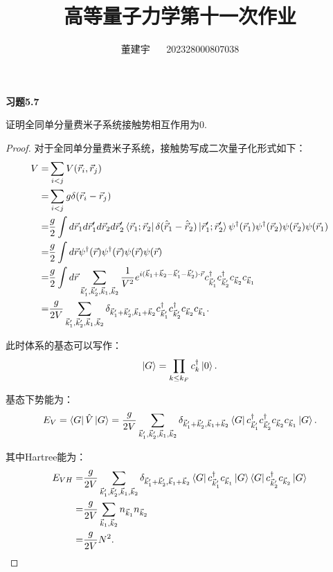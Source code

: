 \documentclass[reqno,a4paper,12pt]{amsart}
\title{高等量子力学第十一次作业}
\author{董建宇 ~~ 202328000807038}
\begin{document}
\maketitle

\textbf{习题5.7}

证明全同单分量费米子系统接触势相互作用为0.

\begin{proof}
对于全同单分量费米子系统，接触势写成二次量子化形式如下：
\begin{align*}
	V =& \sum_{i<j} V(\vec{r}_i, \vec{r}_j) \\
	=& \sum_{i<j} g \delta(\vec{r}_i - \vec{r}_j) \\
	=& \frac{g}{2} \int d\vec{r}_1 d\vec{r}_1' d\vec{r}_2 d\vec{r}_2' \bra{\vec{r}_1; \vec{r}_2} \delta(\hat{\vec{r}}_1 - \hat{\vec{r}}_2) \ket{\vec{r}_1'; \vec{r}_2'} \psi^\dagger(\vec{r}_1) \psi^\dagger(\vec{r}_2) \psi(\vec{r}_2) \psi(\vec{r}_1) \\
	=& \frac{g}{2} \int d\vec{r} \psi^\dagger(\vec{r}) \psi^\dagger(\vec{r}) \psi(\vec{r}) \psi(\vec{r}) \\
	=& \frac{g}{2} \int d\vec{r} \sum_{\vec{k}_1',\vec{k}_2',\vec{k}_1,\vec{k}_2} \frac{1}{V^2} e^{i(\vec{k}_1+\vec{k}_2-\vec{k}_1'-\vec{k}_2') \cdot \vec{r}} c^\dagger_{\vec{k}_1'} c^\dagger_{\vec{k}_2'} c_{\vec{k}_2} c_{\vec{k}_1} \\
	=& \frac{g}{2V} \sum_{\vec{k}_1',\vec{k}_2',\vec{k}_1,\vec{k}_2} \delta_{\vec{k}_1'+\vec{k}_2', \vec{k}_1+\vec{k}_2} c^\dagger_{\vec{k}_1'} c^\dagger_{\vec{k}_2'} c_{\vec{k}_2} c_{\vec{k}_1}.
\end{align*}

此时体系的基态可以写作：
\[
	\ket{G} = \prod_{k\leq k_F} c_k^\dagger \ket{0}.
\]

基态下势能为：
\[
	E_V = \bra{G} \hat{V} \ket{G} = \frac{g}{2V} \sum_{\vec{k}_1',\vec{k}_2',\vec{k}_1,\vec{k}_2} \delta_{\vec{k}_1'+\vec{k}_2', \vec{k}_1+\vec{k}_2} \bra{G} c^\dagger_{\vec{k}_1'} c^\dagger_{\vec{k}_2'} c_{\vec{k}_2} c_{\vec{k}_1} \ket{G}.
\]

其中Hartree能为：
\begin{align*}
	E_{VH} =& \frac{g}{2V} \sum_{\vec{k}_1',\vec{k}_2',\vec{k}_1,\vec{k}_2} \delta_{\vec{k}_1'+\vec{k}_2', \vec{k}_1+\vec{k}_2} \bra{G} c^\dagger_{\vec{k}_1'} c_{\vec{k}_1} \ket{G} \bra{G} c^\dagger_{\vec{k}_2'} c_{\vec{k}_2} \ket{G} \\
	=& \frac{g}{2V} \sum_{\vec{k}_1, \vec{k}_2} n_{\vec{k}_1} n_{\vec{k}_2} \\
	=& \frac{g}{2V} N^2.
\end{align*}


\end{proof}
\end{document}
